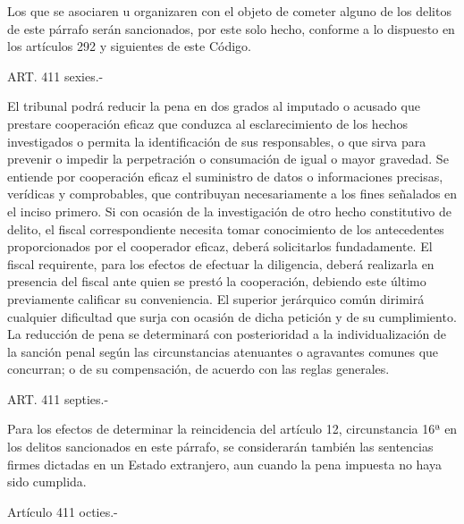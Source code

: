     Los que se asociaren u organizaren con el objeto de cometer alguno de los delitos de este párrafo serán sancionados, por este solo hecho, conforme a lo dispuesto en los artículos 292 y siguientes de este Código.

    ART. 411 sexies.-

    El tribunal podrá reducir la pena en dos grados al imputado o acusado que prestare cooperación eficaz que conduzca al esclarecimiento de los hechos investigados o permita la identificación de sus responsables, o que sirva para prevenir o impedir la perpetración o consumación de igual o mayor gravedad.
    Se entiende por cooperación eficaz el suministro de datos o informaciones precisas, verídicas y comprobables, que contribuyan necesariamente a los fines señalados en el inciso primero.
    Si con ocasión de la investigación de otro hecho constitutivo de delito, el fiscal correspondiente necesita tomar conocimiento de los antecedentes proporcionados por el cooperador eficaz, deberá solicitarlos fundadamente. El fiscal requirente, para los efectos de efectuar la diligencia, deberá realizarla en presencia del fiscal ante quien se prestó la cooperación, debiendo este último previamente calificar su conveniencia. El superior jerárquico común dirimirá cualquier dificultad que surja con ocasión de dicha petición y de su cumplimiento.
    La reducción de pena se determinará con posterioridad a la individualización de la sanción penal según las circunstancias atenuantes o agravantes comunes que concurran; o de su compensación, de acuerdo con las reglas generales.


    ART. 411 septies.-

    Para los efectos de determinar la reincidencia del artículo 12, circunstancia 16ª en los delitos sancionados en este párrafo, se considerarán también las sentencias firmes dictadas en un Estado extranjero, aun cuando la pena impuesta no haya sido cumplida.


    Artículo 411 octies.-

